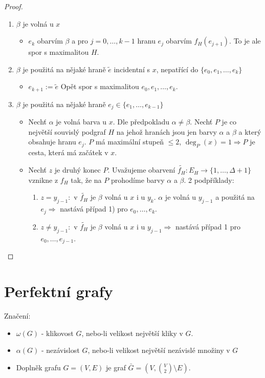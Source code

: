 \begin{proof}
	\begin{enumerate}
		\item $\beta$ je volná u $x$
		\begin{itemize}
			\item $e_{k}$ obarvím $\beta$ a pro $j = 0, \dots, k-1$ hranu $e_{j}$ obarvím $f_{H}(e_{j+1})$. To je ale spor s maximalitou $H$.
		\end{itemize}
		\item $\beta$ je použitá na nějaké hraně $\tilde{e}$ incidentní s $x$, nepatřící do $\{e_{0}, e_{1}, \dots, e_{k}\}$
		\begin{itemize}
			\item $e_{k+1} := \tilde{e}$ Opět spor s maximalitou $e_{0}, e_{1}, \dots, e_{k}$.
		\end{itemize}
		\item $\beta$ je použitá na nějaké hraně $e_{j} \in \{e_{1}, \dots, e_{k-1}\}$
		\begin{itemize}
			\item Nechť $\alpha$ je volná barva u $x$. Dle předpokladu $\alpha \neq \beta$. Nechť $P$ je co největší souvislý podgraf $H$ na jehož hranách jsou jen barvy $\alpha$ a $\beta$ a který obsahuje hranu $e_{j}$. $P$ má maximální stupeň $\leq 2$, $\deg_{P}(x) = 1 \Rightarrow P$ je cesta, která má začátek v $x$.
			\item Nechť $z$ je druhý konec $P$. Uvažujeme obarvení $\tilde{f_{H}}: E_{H} \to \{1, \dots, \Delta + 1\}$ vznikne z $f_{H}$ tak, že na $P$ prohodíme barvy $\alpha$ a $\beta$. 2 podpříklady:
			\begin{enumerate}
				\item $z = y_{j-1}:$ v $\tilde{f_{H}}$ je $\beta$ volná u $x$ i u $y_{k}$. $\alpha$ je volná u $y_{j-1}$ a použitá na $e_{j} \Rightarrow$ nastává případ 1) pro $e_{0}, \dots, e_{k}$.
				\item $z \neq y_{j-1}:$ v $\tilde{f_{H}}$ je $\beta$ volná u $x$ i u $y_{j-1} \Rightarrow$ nastává případ 1 pro $e_{0}, \dots, e_{j-1}$.
			\end{enumerate}
		\end{itemize}
	\end{enumerate}
\end{proof}

\section{Perfektní grafy}

\begin{definice}
	Značení:
	
	\begin{itemize}
		\item $\omega(G)$ - klikovost $G$, nebo-li velikost největší kliky v $G$.
		\item $\alpha(G)$ - nezávislost $G$, nebo-li velikost největší nezávislé množiny v $G$
		\item Doplněk grafu $G =(V,E)$ je graf $\bar{G}=(V, \binom{V}{2} \setminus E)$.
	\end{itemize}
\end{definice}

